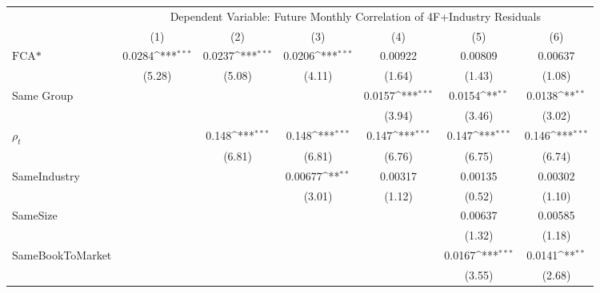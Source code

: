 {
\def\sym#1{\ifmmode^{#1}\else\(^{#1}\)\fi}
\begin{tabular}{l*{6}{c}}
\hline\hline
                &\multicolumn{6}{c}{Dependent Variable: Future Monthly Correlation of 4F+Industry Residuals}                      \\\cmidrule(lr){2-7}
                &\multicolumn{1}{c}{(1)}         &\multicolumn{1}{c}{(2)}         &\multicolumn{1}{c}{(3)}         &\multicolumn{1}{c}{(4)}         &\multicolumn{1}{c}{(5)}         &\multicolumn{1}{c}{(6)}         \\
\hline
$ \text{FCA*} $ &   0.0284\sym{***}&   0.0237\sym{***}&   0.0206\sym{***}&  0.00922         &  0.00809         &  0.00637         \\
                &   (5.28)         &   (5.08)         &   (4.11)         &   (1.64)         &   (1.43)         &   (1.08)         \\
[1em]
Same Group      &                  &                  &                  &   0.0157\sym{***}&   0.0154\sym{**} &   0.0138\sym{**} \\
                &                  &                  &                  &   (3.94)         &   (3.46)         &   (3.02)         \\
[1em]
 $ {\rho_t} $   &                  &    0.148\sym{***}&    0.148\sym{***}&    0.147\sym{***}&    0.147\sym{***}&    0.146\sym{***}\\
                &                  &   (6.81)         &   (6.81)         &   (6.76)         &   (6.75)         &   (6.74)         \\
[1em]
SameIndustry    &                  &                  &  0.00677\sym{**} &  0.00317         &  0.00135         &  0.00302         \\
                &                  &                  &   (3.01)         &   (1.12)         &   (0.52)         &   (1.10)         \\
[1em]
SameSize        &                  &                  &                  &                  &  0.00637         &  0.00585         \\
                &                  &                  &                  &                  &   (1.32)         &   (1.18)         \\
[1em]
SameBookToMarket&                  &                  &                  &                  &   0.0167\sym{***}&   0.0141\sym{**} \\
                &                  &                  &                  &                  &   (3.55)         &   (2.68)         \\

\end{tabular}}
